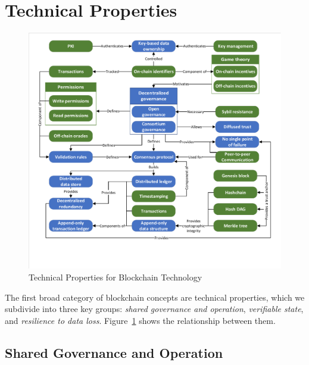
\section{Technical Properties}
\label{sec:blockchain}

\begin{figure}
	\centering
	\includegraphics[page=2,width=\columnwidth]{figures/grounded-theory-main}
	\caption{Technical Properties for Blockchain Technology}
	\label{fig:technical-properties}
\end{figure}

The first broad category of blockchain concepts are technical properties, which we subdivide into three key groups: \textit{shared governance and operation}, \textit{verifiable state}, and 
\textit{resilience to data loss}. Figure~\ref{fig:technical-properties} shows the relationship between them.

\subsection{Shared Governance and Operation}
\label{sec:sharedgov}

